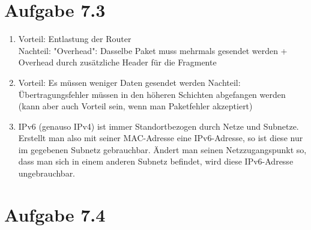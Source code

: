 \documentclass[12pt, a4paper]{article}
\begin{document}


\newpage


\section*{Aufgabe 7.3}
\begin{enumerate}[label=\alph*)]
	\item	Vorteil: Entlastung der Router \\
			Nachteil: "Overhead": Dasselbe Paket muss mehrmals gesendet werden + Overhead durch zusätzliche Header für die Fragmente
	\item	Vorteil: Es müssen weniger Daten gesendet werden
			Nachteil: Übertragungsfehler müssen in den höheren Schichten abgefangen werden (kann aber auch Vorteil sein, wenn man Paketfehler akzeptiert)
	\item	IPv6 (genauso IPv4) ist immer Standortbezogen durch Netze und Subnetze. Erstellt man also mit seiner MAC-Adresse eine IPv6-Adresse, so ist diese nur im gegebenen Subnetz gebrauchbar. Ändert man seinen Netzzugangspunkt so, dass man sich in einem anderen Subnetz befindet, wird diese IPv6-Adresse ungebrauchbar.
\end{enumerate}


\newpage


\section*{Aufgabe 7.4}
\end{document}
